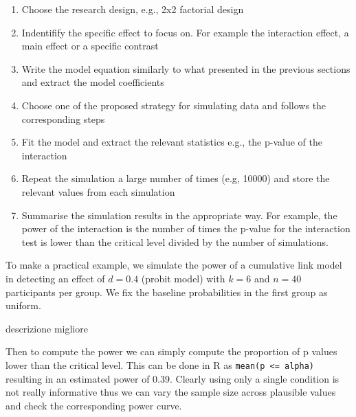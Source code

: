 \documentclass[
  man,floatsintext]{apa6}
\providecommand{\tightlist}{%
  \setlength{\itemsep}{0pt}\setlength{\parskip}{0pt}}
\begin{document}
\begin{enumerate}
\def\labelenumi{\arabic{enumi}.}
\tightlist
\item
  Choose the research design, e.g., 2x2 factorial design
\item
  Indentifify the specific effect to focus on. For example the interaction effect, a main effect or a specific contrast
\item
  Write the model equation similarly to what presented in the previous sections and extract the model coefficients
\item
  Choose one of the proposed strategy for simulating data and follows the corresponding steps
\item
  Fit the model and extract the relevant statistics e.g., the p-value of the interaction
\item
  Repeat the simulation a large number of times (e.g, 10000) and store the relevant values from each simulation
\item
  Summarise the simulation results in the appropriate way. For example, the power of the interaction is the number of times the p-value for the interaction test is lower than the critical level divided by the number of simulations.
\end{enumerate}

To make a practical example, we simulate the power of a cumulative link model in detecting an effect of \(d = 0.4\) (probit model) with \(k = 6\) and \(n = 40\) participants per group. We fix the baseline probabilities in the first group as uniform.

descrizione migliore

\scriptsize

\normalsize

Then to compute the power we can simply compute the proportion of p values lower than the critical level. This can be done in R as \texttt{mean(p\ \textless{}=\ alpha)} resulting in an estimated power of 0.39. Clearly using only a single condition is not really informative thus we can vary the sample size across plausible values and check the corresponding power curve.

\scriptsize

\normalsize

\scriptsize
\end{document}
